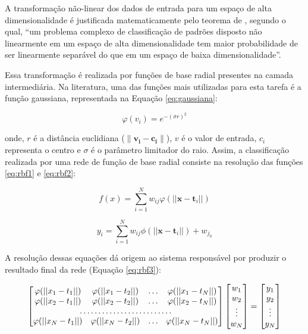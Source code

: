 \documentclass[qual, classic, a4paper]{ufbathesis}
\begin{document}
A transformação não-linear dos dados de entrada para um espaço de alta dimensionalidade é justificada matematicamente pelo teorema de , 
segundo o qual, ``um problema complexo de classificação de padrões disposto não linearmente em um espaço de alta dimensionalidade tem maior probabilidade de ser linearmente separável do que em um espaço de baixa dimensionalidade''.

Essa transformação é realizada por funções de base radial presentes na camada intermediária. 
Na literatura, uma das funções mais utilizadas para esta tarefa é a função gaussiana, representada na Equação \ref{eq:gaussiana}:

\begin{equation}
    \label{eq:gaussiana}
    \varphi (v_{i})=e^{-(\sigma r)^{2}}
\end{equation}

onde, $r$ é a distância euclidiana ($\|\mathbf {v_{i}} - \mathbf {c_{i}}\|$), $v$ é o valor de entrada, $c_i$ representa o centro e $\sigma$ é o parâmetro limitador do raio.
Assim, a classificação realizada por uma rede de função de base radial consiste na resolução das funções \ref{eq:rbf1} e \ref{eq:rbf2}:

\begin{equation} \label{eq:rbf1}
    f(x)=\sum _{{i=1}}^{N}w_{ij}\varphi (||{\mathbf  {x}}-{\mathbf  {t}}_{i}||)
\end{equation}

\begin{equation} \label{eq:rbf2}
    y_i=\sum _{{i=1}}^{N}w_{ij}\phi (||{\mathbf  {x}}-{\mathbf  {t}}_{i}||) + w_{j_0}
\end{equation}

A resolução dessas equações dá origem ao sistema responsável por produzir o resultado final da rede (Equação \ref{eq:rbf3}):

\begin{equation} \label{eq:rbf3}
\begin{bmatrix}
    \varphi (||{{x_1}}-{{t}}_{1}||) & \varphi (||{{x_1}}-{{t}}_{2}||) & \dots & \varphi (||{{x_1}}-{{t}}_{N}||) \\
    \varphi (||{{x_2}}-{{t}}_{1}||) & \varphi (||{{x_2}}-{{t}}_{2}||) & \dots & \varphi (||{{x_2}}-{{t}}_{N}||) \\
    \hdotsfor{5} \\
    \varphi (||{{x_N}}-{{t}}_{1}||) & \varphi (||{{x_N}}-{{t}}_{2}||) & \dots & \varphi (||{{x_N}}-{{t}}_{N}||)
\end{bmatrix}
\begin{bmatrix}
    w_1 \\
    w_2 \\
    \vdots \\
    w_N \\
\end{bmatrix}
=
\begin{bmatrix}
    y_1 \\
    y_2 \\
    \vdots \\
    y_N \\
\end{bmatrix}
\end{equation}
\end{document}
